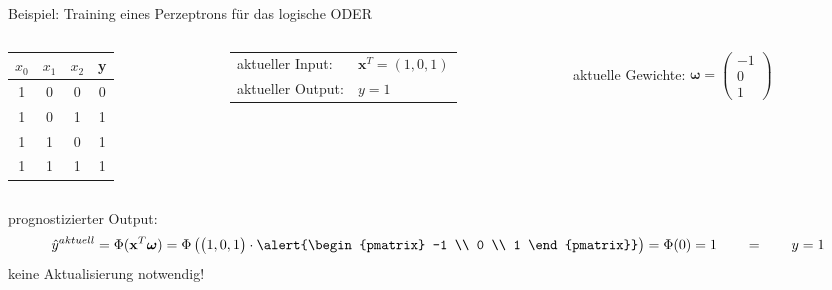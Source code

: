 \documentclass[11pt, aspectratio=169, t]{beamer}
\begin{document}
\begin{frame}{Beispiel: Training eines Perzeptrons für das logische ODER}
\begin{small}
\begin{columns}
\begin{column}{0.25\textwidth}
\hspace{0.5cm}
\begin{footnotesize}
\begin{tabular}{cccc} \toprule
$x_0$ & $x_1$ & $x_2$ & y \\ \midrule
1 & 0 & 0 & 0 \\
1 & 0 & 1 & 1 \\
1 & 1 & 0 & 1 \\
1 & 1 & 1 & 1 \\ \bottomrule
\end{tabular} \end{footnotesize}
\end{column}
\begin{column}{0.4\textwidth}
\begin{tabular}{ll}
aktueller Input: & $\mathbf{x}^{T} = (1, 0, 1)$ \\
aktueller Output: & $y=1$ \\
\end{tabular}
\end{column}
\begin{column}{0.4\textwidth}
aktuelle Gewichte: \alert{ $\boldsymbol{\omega} = \begin{pmatrix} -1 \\ 0 \\ 1 \end{pmatrix}$ }
\end{column}
\end{columns}
prognostizierter Output:
\[\hat{y}^{aktuell} = \Phi(\mathbf{x}^{T}\boldsymbol{\omega}) = \Phi\left( \begin{pmatrix} 1, 0, 1 \end{pmatrix}\cdot \alert{\begin{pmatrix} -1 \\ 0 \\ 1 \end{pmatrix}} \right) = \Phi(0) = 1 \qquad = \qquad y = 1\]
keine Aktualisierung notwendig!
\begin{align*} %
\phantom{\omega_0^{\text{neu}}} & \\
\phantom{\omega_1^{\text{neu}}} & \\
\phantom{\omega_2^{\text{neu}}} &
\end{align*}
\end{small}
\end{frame}
\end{document}

